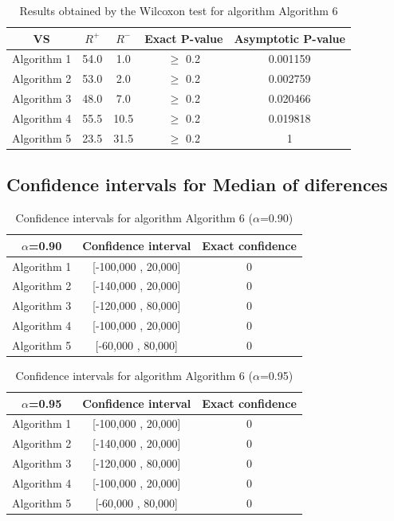 \documentclass[a4paper,10pt]{article}
\begin{document}
\begin{table}[!htp]
\centering\small
\begin{tabular}{
|c|c|c|c|c|}
\hline
 VS & $R^{+}$ & $R^{-}$ & Exact P-value & Asymptotic P-value \\ \hline 
Algorithm 1 & 54.0 & 1.0 & $\geq$ 0.2 & 0.001159\\ \hline 
Algorithm 2 & 53.0 & 2.0 & $\geq$ 0.2 & 0.002759\\ \hline 
Algorithm 3 & 48.0 & 7.0 & $\geq$ 0.2 & 0.020466\\ \hline 
Algorithm 4 & 55.5 & 10.5 & $\geq$ 0.2 & 0.019818\\ \hline 
Algorithm 5 & 23.5 & 31.5 & $\geq$ 0.2 & 1\\ \hline 

\end{tabular}
\caption{Results obtained by the Wilcoxon test for algorithm Algorithm 6}
\end{table}

\subsection{Confidence intervals for Median of diferences}

\begin{table}[!htp]
\centering\small
\begin{tabular}{
|c|c|c|}
\hline
 $\alpha$=0.90 & Confidence interval & Exact confidence \\ \hline 
Algorithm 1 & [-100,000 , 20,000] & 0\\ \hline 
Algorithm 2 & [-140,000 , 20,000] & 0\\ \hline 
Algorithm 3 & [-120,000 , 80,000] & 0\\ \hline 
Algorithm 4 & [-100,000 , 20,000] & 0\\ \hline 
Algorithm 5 & [-60,000 , 80,000] & 0\\ \hline 

\end{tabular}
\caption{Confidence intervals for algorithm Algorithm 6 ($\alpha$=0.90)}
\end{table}
\begin{table}[!htp]
\centering\small
\begin{tabular}{
|c|c|c|}
\hline
 $\alpha$=0.95 & Confidence interval & Exact confidence \\ \hline 
Algorithm 1 & [-100,000 , 20,000] & 0\\ \hline 
Algorithm 2 & [-140,000 , 20,000] & 0\\ \hline 
Algorithm 3 & [-120,000 , 80,000] & 0\\ \hline 
Algorithm 4 & [-100,000 , 20,000] & 0\\ \hline 
Algorithm 5 & [-60,000 , 80,000] & 0\\ \hline 

\end{tabular}
\caption{Confidence intervals for algorithm Algorithm 6 ($\alpha$=0.95)}
\end{table}

 \clearpage 
\end{document}
